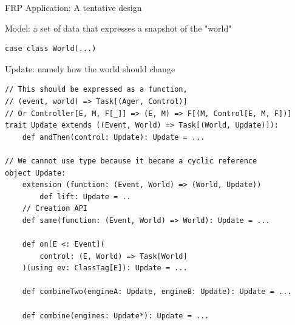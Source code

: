 \documentclass[presentation, 9pt]{beamer}\mode<presentation>{\usetheme{AMSBolognaFC}}
\begin{document}
\begin{frame}{FRP Application: A tentative design \href{https://github.com/cric96/scala-frp-gui}{\faLink}}
\begin{alertblock}{Model: a set of data that expresses a snapshot of the "world"}
\begin{tcolorbox}[left=0pt, top=0pt, bottom=0pt]
\begin{verbatim}
case class World(...)
			\end{verbatim}
			\end{tcolorbox}
		\end{alertblock}

		\begin{alertblock}{Update: namely how the world should change}
			\begin{tcolorbox}[left=0pt, top=0pt, bottom=0pt]
				\begin{verbatim}
// This should be expressed as a function, 
// (event, world) => Task[(Ager, Control)]
// Or Controller[E, M, F[_]] => (E, M) => F[(M, Control[E, M, F])]
trait Update extends ((Event, World) => Task[(World, Update)]):
	def andThen(control: Update): Update = ...

// We cannot use type because it became a cyclic reference
object Update:
	extension (function: (Event, World) => (World, Update))
		def lift: Update = ..
	// Creation API
	def same(function: (Event, World) => World): Update = ...

	def on[E <: Event](
		control: (E, World) => Task[World]
	)(using ev: ClassTag[E]): Update = ...

	def combineTwo(engineA: Update, engineB: Update): Update = ...

	def combine(engines: Update*): Update = ...
				\end{verbatim}
				\end{tcolorbox}
			\end{alertblock}


\end{frame}
\end{document}
